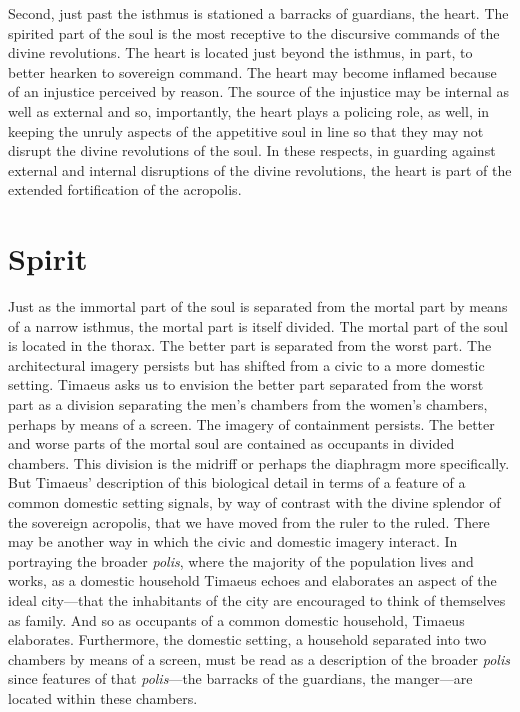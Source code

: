 Second, just past the isthmus is stationed a barracks of guardians, the heart. The spirited part of the soul is the most receptive to the discursive commands of the divine revolutions. The heart is located just beyond the isthmus, in part, to better hearken to sovereign command. The heart may become inflamed because of an injustice perceived by reason. The source of the injustice may be internal as well as external and so, importantly, the heart plays a policing role, as well, in keeping the unruly aspects of the appetitive soul in line so that they may not disrupt the divine revolutions of the soul. In these respects, in guarding against external and internal disruptions of the divine revolutions, the heart is part of the extended fortification of the acropolis.


\section{Spirit} %
\label{sec:spirit}

Just as the immortal part of the soul is separated from the mortal part by means of a narrow isthmus, the mortal part is itself divided. The mortal part of the soul is located in the thorax. The better part is separated from the worst part. The architectural imagery persists but has shifted from a civic to a more domestic setting. Timaeus asks us to envision the better part separated from the worst part as a division separating the men's chambers from the women's chambers, perhaps by means of a screen. The imagery of containment persists. The better and worse parts of the mortal soul are contained as occupants in divided chambers. This division is the midriff or perhaps the diaphragm more specifically. But Timaeus' description of this biological detail in terms of a feature of a common domestic setting signals, by way of contrast with the divine splendor of the sovereign acropolis, that we have moved from the ruler to the ruled. There may be another way in which the civic and domestic imagery interact. In portraying the broader \emph{polis}, where the majority of the population lives and works, as a domestic household Timaeus echoes and elaborates an aspect of the ideal city---that the inhabitants of the city are encouraged to think of themselves as family. And so as occupants of a common domestic household, Timaeus elaborates. Furthermore, the domestic setting, a household separated into two chambers by means of a screen, must be read as a description of the broader \emph{polis} since features of that \emph{polis}---the barracks of the guardians, the manger---are located within these chambers.


